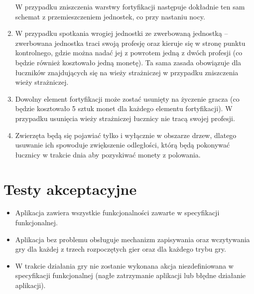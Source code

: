 \documentclass[12pt, a4paper]{article}
\begin{document}
\begin{enumerate}
W przypadku zniszczenia warstwy fortyfikacji następuje dokładnie ten sam schemat z przemieszczeniem jednostek, co przy nastaniu nocy.
\item W przypadku spotkania wrogiej jednostki ze zwerbowaną jednostką -- zwerbowana jednostka traci swoją profesję oraz kieruje się w stronę punktu kontrolnego, gdzie można nadać jej z powrotem jedną z dwóch profesji (co będzie również kosztowało jedną monetę). Ta sama zasada obowiązuje dla łuczników znajdujących się na wieży strażniczej w przypadku zniszczenia wieży strażniczej.
\item Dowolny element fortyfikacji może zostać usunięty na życzenie gracza (co będzie kosztowało 5 sztuk monet dla każdego elementu fortyfikacji). W przypadku usunięcia wieży strażniczej łucznicy nie tracą swojej profesji.
\item Zwierzęta będą się pojawiać tylko i wyłącznie w obszarze drzew, dlatego usuwanie ich spowoduje zwiększenie odległości, którą będą pokonywać łucznicy w trakcie dnia aby pozyskiwać monety z polowania.
\end{enumerate}

\section{Testy akceptacyjne}
\begin{itemize}
\item Aplikacja zawiera wszystkie funkcjonalności zawarte w specyfikacji funkcjonalnej.
\item Aplikacja bez problemu obsługuje mechanizm zapisywania oraz wczytywania gry dla każdej z trzech rozpoczętych gier oraz dla każdego trybu gry.
\item W trakcie działania gry nie zostanie wykonana akcja niezdefiniowana w specyfikacji funkcjonalnej (nagłe zatrzymanie aplikacji lub błędne działanie aplikacji).
\end{itemize}
\end{document}
